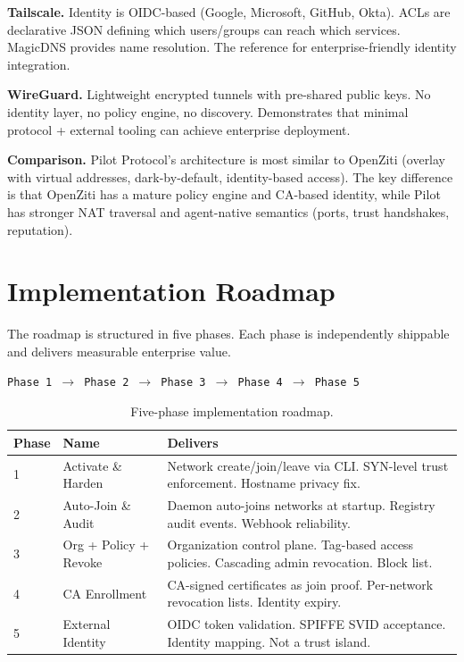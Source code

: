 \documentclass[11pt,a4paper]{article}
\begin{document}
\textbf{Tailscale.} Identity is OIDC-based (Google, Microsoft, GitHub, Okta). ACLs are declarative JSON defining which users/groups can reach which services. MagicDNS provides name resolution. The reference for enterprise-friendly identity integration.

\textbf{WireGuard.} Lightweight encrypted tunnels with pre-shared public keys. No identity layer, no policy engine, no discovery. Demonstrates that minimal protocol + external tooling can achieve enterprise deployment.

\textbf{Comparison.} Pilot Protocol's architecture is most similar to OpenZiti (overlay with virtual addresses, dark-by-default, identity-based access). The key difference is that OpenZiti has a mature policy engine and CA-based identity, while Pilot has stronger NAT traversal and agent-native semantics (ports, trust handshakes, reputation).

\section{Implementation Roadmap}

The roadmap is structured in five phases. Each phase is independently shippable and delivers measurable enterprise value.

\begin{center}
\texttt{Phase 1 $\rightarrow$ Phase 2 $\rightarrow$ Phase 3 $\rightarrow$ Phase 4 $\rightarrow$ Phase 5}
\end{center}

\begin{table}[h]
\centering
\begin{tabular}{@{}llp{7cm}@{}}
\toprule
\textbf{Phase} & \textbf{Name} & \textbf{Delivers} \\
\midrule
1 & Activate \& Harden & Network create/join/leave via CLI. SYN-level trust enforcement. Hostname privacy fix. \\
2 & Auto-Join \& Audit & Daemon auto-joins networks at startup. Registry audit events. Webhook reliability. \\
3 & Org + Policy + Revoke & Organization control plane. Tag-based access policies. Cascading admin revocation. Block list. \\
4 & CA Enrollment & CA-signed certificates as join proof. Per-network revocation lists. Identity expiry. \\
5 & External Identity & OIDC token validation. SPIFFE SVID acceptance. Identity mapping. Not a trust island. \\
\bottomrule
\end{tabular}
\caption{Five-phase implementation roadmap.}
\label{tab:roadmap}
\end{table}
\end{document}
